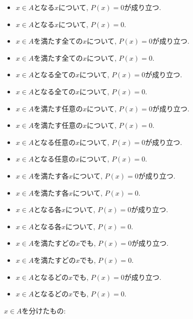 \documentclass[a4paper,12pt,draft]{amsart}
\begin{document}
\begin{itemize}
\item $x\in A$となる$x$について, $P(x)=0$が成り立つ.
\item $x\in A$となる$x$について, $P(x)=0$.
\item $x\in A$を満たす全ての$x$について, $P(x)=0$が成り立つ.
\item $x\in A$を満たす全ての$x$について, $P(x)=0$.
\item $x\in A$となる全ての$x$について, $P(x)=0$が成り立つ.
\item $x\in A$となる全ての$x$について, $P(x)=0$.
\item $x\in A$を満たす任意の$x$について, $P(x)=0$が成り立つ.
\item $x\in A$を満たす任意の$x$について, $P(x)=0$.
\item $x\in A$となる任意の$x$について, $P(x)=0$が成り立つ.
\item $x\in A$となる任意の$x$について, $P(x)=0$.
\item $x\in A$を満たす各$x$について, $P(x)=0$が成り立つ.
\item $x\in A$を満たす各$x$について, $P(x)=0$.
\item $x\in A$となる各$x$について, $P(x)=0$が成り立つ.
\item $x\in A$となる各$x$について, $P(x)=0$.
\item $x\in A$を満たすどの$x$でも, $P(x)=0$が成り立つ.
\item $x\in A$を満たすどの$x$でも, $P(x)=0$.
\item $x\in A$となるどの$x$でも, $P(x)=0$が成り立つ.
\item $x\in A$となるどの$x$でも, $P(x)=0$.
\end{itemize}
$x\in A$を分けたもの:
\end{document}
